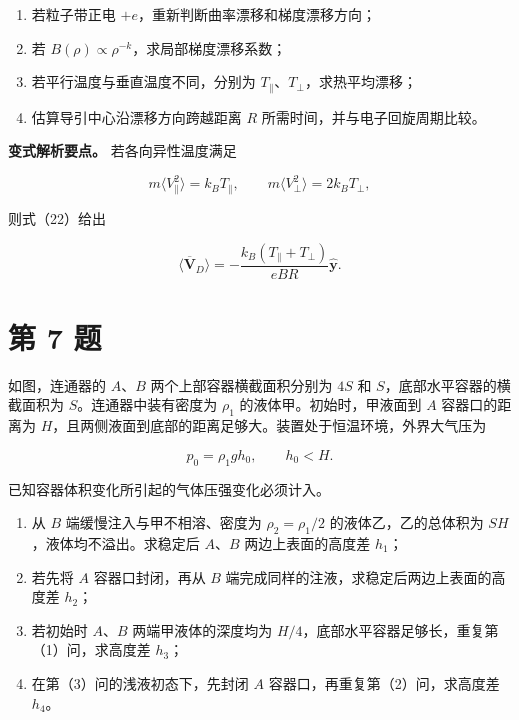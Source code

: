 \documentclass[12pt,a4paper,UTF8]{ctexart}
\newcommand{\tightlist}{\setlength{\itemsep}{0pt}\setlength{\parskip}{0pt}}
\begin{document}
\begin{enumerate}
\def\labelenumi{\arabic{enumi}.}
\tightlist
\item
  若粒子带正电 \(+e\)，重新判断曲率漂移和梯度漂移方向；
\item
  若 \(B(\rho)\propto\rho^{-k}\)，求局部梯度漂移系数；
\item
  若平行温度与垂直温度不同，分别为
  \(T_\parallel\)、\(T_\perp\)，求热平均漂移；
\item
  估算导引中心沿漂移方向跨越距离 \(R\) 所需时间，并与电子回旋周期比较。
\end{enumerate}

\textbf{变式解析要点。} 若各向异性温度满足

\[
m\langle V_\parallel^2\rangle=k_BT_\parallel,
\qquad
m\langle V_\perp^2\rangle=2k_BT_\perp,
\]

则式（22）给出

\[
\langle\overline{\boldsymbol V}_D\rangle
=-\frac{k_B(T_\parallel+T_\perp)}{eBR}
\hat{\boldsymbol y}.
\]

\newpage

\section{第 7 题}\label{ux7b2c-7-ux9898}

如图，连通器的 \(A\)、\(B\) 两个上部容器横截面积分别为 \(4S\) 和
\(S\)，底部水平容器的横截面积为 \(S\)。连通器中装有密度为 \(\rho_1\)
的液体甲。初始时，甲液面到 \(A\) 容器口的距离为
\(H\)，且两侧液面到底部的距离足够大。装置处于恒温环境，外界大气压为

\[
p_0=\rho_1gh_0,
\qquad h_0<H.
\]

已知容器体积变化所引起的气体压强变化必须计入。

\begin{enumerate}
\def\labelenumi{\arabic{enumi}.}
\tightlist
\item
  从 \(B\) 端缓慢注入与甲不相溶、密度为 \(\rho_2=\rho_1/2\)
  的液体乙，乙的总体积为 \(SH\)，液体均不溢出。求稳定后 \(A\)、\(B\)
  两边上表面的高度差 \(h_1\)；
\item
  若先将 \(A\) 容器口封闭，再从 \(B\)
  端完成同样的注液，求稳定后两边上表面的高度差 \(h_2\)；
\item
  若初始时 \(A\)、\(B\) 两端甲液体的深度均为
  \(H/4\)，底部水平容器足够长，重复第（1）问，求高度差 \(h_3\)；
\item
  在第（3）问的浅液初态下，先封闭 \(A\)
  容器口，再重复第（2）问，求高度差 \(h_4\)。
\end{enumerate}
\end{document}
